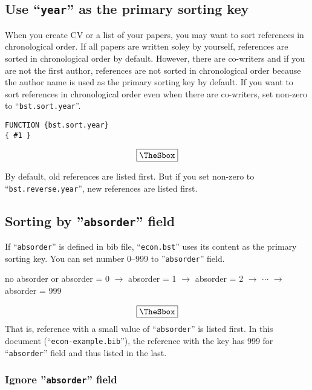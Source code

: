 \documentclass[10pt]{article}
\newenvironment{Frame}%
{\setlength{\fboxsep}{15pt}
\setlength{\mylength}{\linewidth}%
\addtolength{\mylength}{-2\fboxsep}%
\addtolength{\mylength}{-2\fboxrule}%
\Sbox
\minipage{\mylength}%
\setlength{\abovedisplayskip}{0pt}%
\setlength{\belowdisplayskip}{0pt}%
}%
{\endminipage\endSbox
\[\fbox{\TheSbox}\]}
\begin{document}
\subsection{Use ``\texttt{year}''  as the primary sorting key}

When you create CV or a list of your papers, you may want to sort
references in chronological order.  If all papers are written soley by
yourself, references are sorted in chronological order by default.
However, there are co-writers and if you are not the first author,
references are not sorted in chronological order because the author name
is used as the primary sorting key by default.
If you want to sort references in chronological order even when
there are co-writers, set non-zero to ``\texttt{bst.sort.year}''.
\begin{Frame}
\begin{verbatim}
FUNCTION {bst.sort.year}
{ #1 }
\end{verbatim}
\end{Frame}

By default, old references are listed first.  But if you set non-zero to
``\texttt{bst.reverse.year}'', new references are listed first.

\subsection{Sorting by ''\texttt{absorder}'' field}

If ``\texttt{absorder}'' is defined in bib file,
``\texttt{econ.bst}'' uses its content as the primary sorting key.
You can set number 0--999 to ''\texttt{absorder}'' field.

\begin{Frame}
\begin{center}
 no absorder or absorder = 0  $\rightarrow$ absorder = 1 $\rightarrow$ absorder = 2
 $\rightarrow$ $\cdots$ $\rightarrow$ absorder = 999
\end{center}
\end{Frame}
That is, reference with a small value of ``\texttt{absorder}'' is listed
first.  In this document (``\texttt{econ-example.bib}''), the reference
with the key \citet{takeda10:_cge_analy_welfar_effec_trade} has 999 for
``\texttt{absorder}'' field and thus listed in the last.


\subsubsection{Ignore ''\texttt{absorder}'' field}
\end{document}
